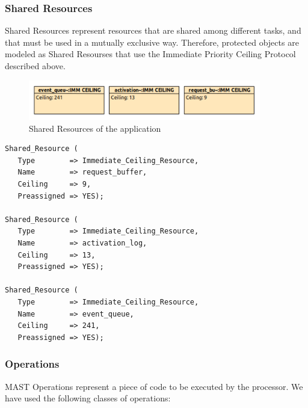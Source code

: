 \documentclass{article}
\begin{document}
\subsubsection{Shared Resources}

Shared Resources represent resources that are shared among different tasks, and that must be used in a mutually exclusive way. Therefore, protected objects are modeled as Shared Resourses that use the Immediate Priority Ceiling Protocol described above.

\begin{figure}[!htbp]
\centering
\includegraphics[width=4in]{images/shared-resources}
\caption{Shared Resources of the application}
\label{shared-resources}
\end{figure}

\begin{lstlisting}
Shared_Resource (
   Type        => Immediate_Ceiling_Resource,
   Name        => request_buffer,
   Ceiling     => 9,
   Preassigned => YES);

Shared_Resource (
   Type        => Immediate_Ceiling_Resource,
   Name        => activation_log,
   Ceiling     => 13,
   Preassigned => YES);

Shared_Resource (
   Type        => Immediate_Ceiling_Resource,
   Name        => event_queue,
   Ceiling     => 241,
   Preassigned => YES);
\end{lstlisting}

\subsubsection{Operations}

MAST Operations represent a piece of code to be executed by the processor. We have used the following classes of operations:
\end{document}
